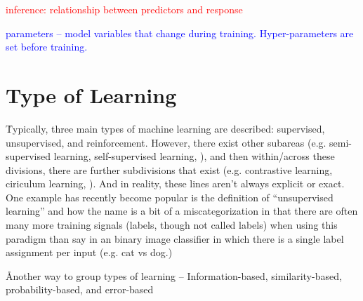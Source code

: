 \textcolor{red}{inference: relationship between predictors and response}

\textcolor{blue}{parameters -- model variables that change during training. Hyper-parameters are set before training.}

\section{Type of Learning}

\r{Typically, three main types of machine learning are described: supervised, unsupervised, and reinforcement. However, there exist other subareas (e.g. semi-supervised learning, self-supervised learning, ), and then within/across these divisions, there are further subdivisions that exist (e.g. contrastive learning, ciriculum learning, ). And in reality, these lines aren't always explicit or exact. One example has recently become popular is the definition of ``unsupervised learning'' and how the name is a bit of a miscategorization in that there are often many more training signals (labels, though not called labels) when using this paradigm than say in an binary image classifier in which there is a single label assignment per input (e.g. cat vs dog.)}

\r{Another way to group types of learning -- Information-based, similarity-based, probability-based, and error-based}

